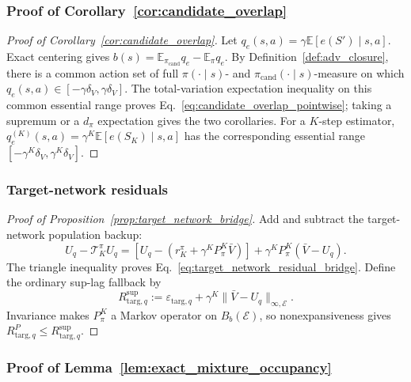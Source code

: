 \documentclass{article}
\theoremstyle{plain}
\theoremstyle{definition}
\theoremstyle{remark}
\newcommand{\E}{\mathbb{E}}
\begin{document}
\subsubsection{Proof of Corollary~\ref{cor:candidate_overlap}}
\label{app:proof_candidate_overlap}

\begin{proof}[Proof of Corollary~\ref{cor:candidate_overlap}]
Let $q_e(s,a)=\gamma\E[e(S')\mid s,a]$. Exact centering gives
$b(s)=\E_{\pi_{\mathrm{cand}}}q_e-\E_\pi q_e$. By
Definition~\ref{def:adv_closure}, there is a common action set of full
$\pi(\cdot\mid s)$- and $\pi_{\mathrm{cand}}(\cdot\mid s)$-measure on which
$q_e(s,a)\in[-\gamma\delta_V,\gamma\delta_V]$. The total-variation
expectation inequality on this common essential range proves
Eq.~\eqref{eq:candidate_overlap_pointwise}; taking a supremum or a
$d_\pi$ expectation gives the two corollaries. For a $K$-step estimator,
$q_e^{(K)}(s,a)=\gamma^K\E[e(S_K)\mid s,a]$ has the corresponding essential
range $[-\gamma^K\delta_V,\gamma^K\delta_V]$.
\end{proof}


\subsubsection{Target-network residuals}
\label{app:proof_target_network_bridge}

\begin{proof}[Proof of Proposition~\ref{prop:target_network_bridge}]
Add and subtract the target-network population backup:
\[
U_q-\mathcal T_K^\pi U_q
=
\left[U_q-\left(r_K^\pi+\gamma^K P_\pi^K\bar V\right)\right]
+\gamma^K P_\pi^K(\bar V-U_q).
\]
The triangle inequality proves Eq.~\eqref{eq:target_network_residual_bridge}.
Define the ordinary sup-lag fallback by
\begin{equation}
R_{\mathrm{targ},q}^{\sup}
:=\varepsilon_{\mathrm{targ},q}+\gamma^K\|\bar V-U_q\|_{\infty,\mathcal E}.
\label{eq:R_targ_sup}
\end{equation}
Invariance makes $P_\pi^K$ a Markov operator on $B_b(\mathcal E)$, so
nonexpansiveness gives $R_{\mathrm{targ},q}^{P}\le R_{\mathrm{targ},q}^{\sup}$.
\end{proof}

\subsubsection{Proof of Lemma~\ref{lem:exact_mixture_occupancy}}
\label{app:proof_mixture_occupancy}
\end{document}
